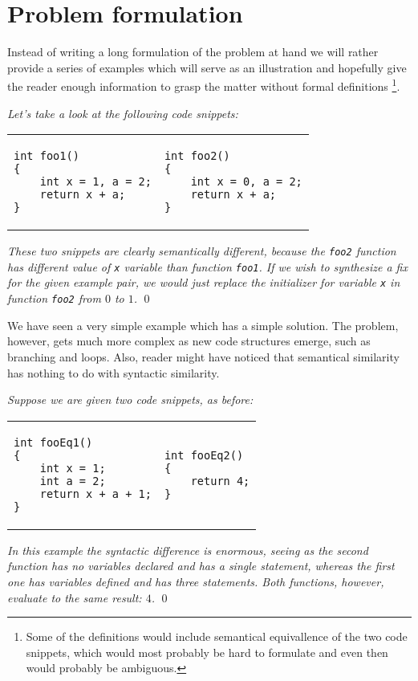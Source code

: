 \section{Problem formulation}
\label{sec:Formulation}

Instead of writing a long formulation of the problem at hand we will rather provide a series of examples which will serve as an illustration and hopefully give the reader enough information to grasp the matter without formal definitions \footnote{Some of the definitions would include semantical equivallence of the two code snippets, which would most probably be hard to formulate and even then would probably be ambiguous.}.

\begin{exmp}
\textit{Let's take a look at the following code snippets:}

\begin{tabular}{ p{4.5cm} p{4.5cm} }
\begin{lstlisting}
int foo1()
{
    int x = 1, a = 2;
    return x + a;
}
\end{lstlisting}
&
\begin{lstlisting}
int foo2()
{
    int x = 0, a = 2;
    return x + a;
}
\end{lstlisting}
\end{tabular}

\textit{These two snippets are clearly semantically different, because the \texttt{foo2} function has different value of \texttt{x} variable than function \texttt{foo1}. If we wish to synthesize a fix for the given example pair, we would just replace the initializer for variable \texttt{x} in function \texttt{foo2}  from $0$ to $1$.}
\qed
\end{exmp}

We have seen a very simple example which has a simple solution. The problem, however, gets much more complex as new code structures emerge, such as branching and loops. Also, reader might have noticed that semantical similarity has nothing to do with syntactic similarity.

\begin{exmp}
\textit{Suppose we are given two code snippets, as before:}

\begin{tabular}{ p{4.5cm} p{4.5cm} }
\begin{lstlisting}
int fooEq1()
{
    int x = 1;
    int a = 2;
    return x + a + 1;
}
\end{lstlisting}
&
\begin{lstlisting}
int fooEq2()
{
    return 4;
}
\end{lstlisting}
\end{tabular}

\textit{In this example the syntactic difference is enormous, seeing as the second function has no variables declared and has a single statement, whereas the first one has variables defined and has three statements. Both functions, however, evaluate to the same result: $4$.}
\qed
\label{exmp:DeleteExmp}
\end{exmp}

